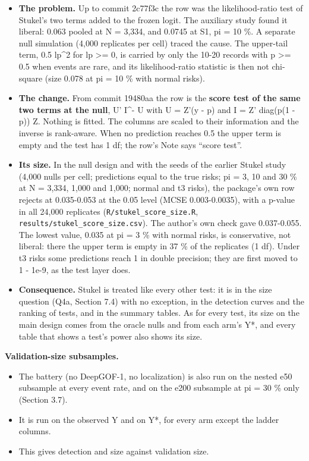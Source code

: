 \documentclass[
  10pt,
]{article}
\providecommand{\tightlist}{%
  \setlength{\itemsep}{0pt}\setlength{\parskip}{0pt}}
\begin{document}
\begin{itemize}
\tightlist
\item
  \textbf{The problem.} Up to commit 2c77f3c the row was the
  likelihood-ratio test of Stukel's two terms added to the
  frozen logit. The auxiliary study found it liberal: 0.063
  pooled at N = 3,334, and 0.0745 at S1, pi = 10 \%. A
  separate null simulation (4,000 replicates per cell)
  traced the cause. The upper-tail term, 0.5 lp\^{}2 for lp
  \textgreater= 0, is carried by only the 10-20 records with
  p \textgreater= 0.5 when events are rare, and its
  likelihood-ratio statistic is then not chi-square (size
  0.078 at pi = 10 \% with normal risks).
\item
  \textbf{The change.} From commit 19480aa the row is the
  \textbf{score test of the same two terms at the null}, U'
  I\^{}- U with U = Z'(y - p) and I = Z' diag(p(1 - p)) Z.
  Nothing is fitted. The columns are scaled to their
  information and the inverse is rank-aware. When no
  prediction reaches 0.5 the upper term is empty and the
  test has 1 df; the row's Note says ``score test''.
\item
  \textbf{Its size.} In the null design and with the seeds
  of the earlier Stukel study (4,000 nulls per cell;
  predictions equal to the true risks; pi = 3, 10 and 30 \%
  at N = 3,334, 1,000 and 1,000; normal and t3 risks), the
  package's own row rejects at 0.035-0.053 at the 0.05 level
  (MCSE 0.003-0.0035), with a p-value in all 24,000
  replicates (\texttt{R/stukel\_score\_size.R},
  \texttt{results/stukel\_score\_size.csv}). The author's
  own check gave 0.037-0.055. The lowest value, 0.035 at pi
  = 3 \% with normal risks, is conservative, not liberal:
  there the upper term is empty in 37 \% of the replicates
  (1 df). Under t3 risks some predictions reach 1 in double
  precision; they are first moved to 1 - 1e-9, as the test
  layer does.
\item
  \textbf{Consequence.} Stukel is treated like every other
  test: it is in the size question (Q4a, Section 7.4) with
  no exception, in the detection curves and the ranking of
  tests, and in the summary tables. As for every test, its
  size on the main design comes from the oracle nulls and
  from each arm's Y*, and every table that shows a test's
  power also shows its size.
\end{itemize}

\textbf{Validation-size subsamples.}

\begin{itemize}
\tightlist
\item
  The battery (no DeepGOF-1, no localization) is also run on
  the nested e50 subsample at every event rate, and on the
  e200 subsample at pi = 30 \% only (Section 3.7).
\item
  It is run on the observed Y and on Y*, for every arm
  except the ladder columns.
\item
  This gives detection and size against validation size.
\end{itemize}
\end{document}
